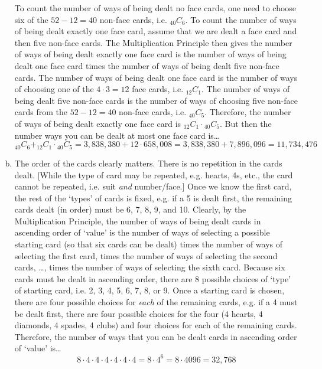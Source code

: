 \documentclass[11pt,letterpaper]{article}
\begin{document}
\begin{enumerate}[(a)]
To count the number of ways of being dealt no face cards, one need to choose six of the $52 - 12= 40$ non-face cards, i.e. $_{40}C_6$. To count the number of ways of being dealt exactly one face card, assume that we are dealt a face card and then five non-face cards. The Multiplication Principle then gives the number of ways of being dealt exactly one face card is the number of ways of being dealt one face card times the number of ways of being dealt five non-face cards. The number of ways of being dealt one face card is the number of ways of choosing one of the $4 \cdot 3= 12$ face cards, i.e. $_{12}C_1$. The number of ways of being dealt five non-face cards is the number of ways of choosing five non-face cards from the $52 - 12= 40$ non-face cards, i.e. $_{40}C_5$. Therefore, the number of ways of being dealt exactly one face card is $_{12}C_1 \cdot {}_{40}C_5$. But then the number ways you can be dealt at most one face card is\dots
	\[
	_{40}C_6 + _{12}C_1 \cdot {}_{40}C_5= 3,\!838,\!380 + 12 \cdot 658,\!008= 3,\!838,\!380 + 7,\!896,\!096= 11,\!734,\!476
	\] \pspace

\item The order of the cards clearly matters. There is no repetition in the cards dealt. [While the type of card may be repeated, e.g. hearts, 4s, etc., the card cannot be repeated, i.e. suit \textit{and} number/face.] Once we know the first card, the rest of the `types' of cards is fixed, e.g. if a 5 is dealt first, the remaining cards dealt (in order) must be 6, 7, 8, 9, and 10. Clearly, by the Multiplication Principle, the number of ways of being dealt cards in ascending order of `value' is the number of ways of selecting a possible starting card (so that six cards can be dealt) times the number of ways of selecting the first card, times the number of ways of selecting the second cards, \dots, times the number of ways of selecting the sixth card. Because six cards must be dealt in ascending order, there are 8 possible choices of `type' of starting card, i.e. 2, 3, 4, 5, 6, 7, 8, or 9. Once a starting card is chosen, there are four possible choices for \textit{each} of the remaining cards, e.g. if a 4 must be dealt first, there are four possible choices for the four (4 hearts, 4 diamonds, 4 spades, 4 clubs) and four choices for each of the remaining cards. Therefore, the number of ways that you can be dealt cards in ascending order of `value' is\dots
	\[
	8 \cdot 4 \cdot 4 \cdot 4 \cdot 4 \cdot 4 \cdot 4= 8 \cdot 4^6= 8 \cdot 4096= 32,\!768
	\]
\end{enumerate}
\end{document}

